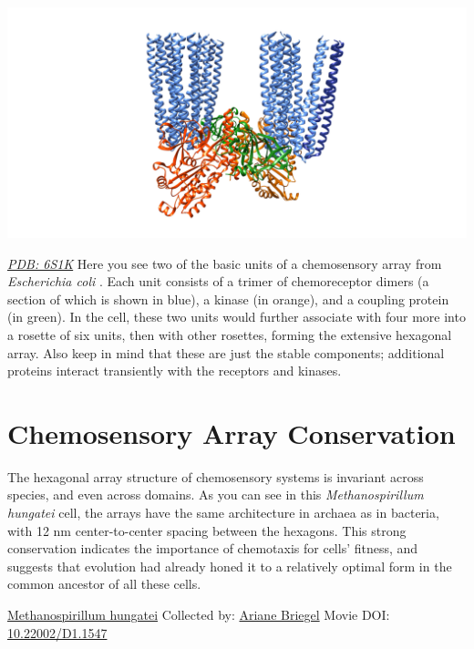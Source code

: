 \documentclass[]{tufte-book}
\begin{document}
\includegraphics{img/schematics/7_2_1}

\href{http://rcsb.org/structure/6S1K}{\emph{PDB: 6S1K}}
Here you see two of the basic units of a chemosensory array from \emph{Escherichia coli} \citep{cassidy2020}. Each unit consists of a trimer of chemoreceptor dimers (a section of which is shown in blue), a kinase (in orange), and a coupling protein (in green). In the cell, these two units would further associate with four more into a rosette of six units, then with other rosettes, forming the extensive hexagonal array. Also keep in mind that these are just the stable components; additional proteins interact transiently with the receptors and kinases.

\hypertarget{chemosensory-array-conservation}{%
\section{Chemosensory Array Conservation}\label{chemosensory-array-conservation}}

The hexagonal array structure of chemosensory systems is invariant across species, and even across domains. As you can see in this \emph{Methanospirillum hungatei} cell, the arrays have the same architecture in archaea as in bacteria, with 12 nm center-to-center spacing between the hexagons. This strong conservation indicates the importance of chemotaxis for cells' fitness, and suggests that evolution had already honed it to a relatively optimal form in the common ancestor of all these cells.



\hypertarget{htmlwidget-4c22ed1b75697fb01fa0}{}

\label{fig:7-3}\protect\hyperlink{tree}{Methanospirillum hungatei} Collected by: \protect\hyperlink{ariane_briegel}{Ariane Briegel} Movie DOI: \href{https://doi.org/10.22002/D1.1547}{10.22002/D1.1547}
\end{document}
